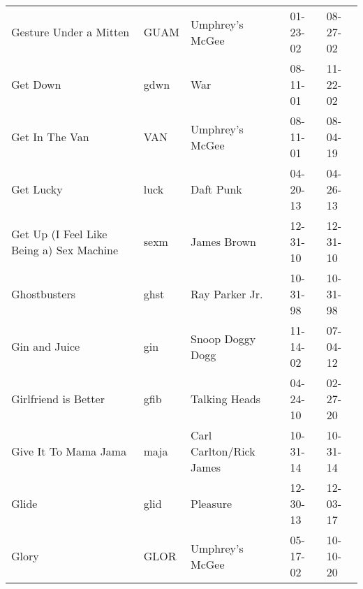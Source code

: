 \begin{longtable}{p{}p{}p{}p{}p{}}
                                                  Gesture Under a Mitten &          GUAM &                                          Umphrey's McGee &              01-23-02 &             08-27-02 \\
                                                                Get Down &          gdwn &                                                      War &              08-11-01 &             11-22-02 \\
                                                          Get In The Van &           VAN &                                          Umphrey's McGee &              08-11-01 &             08-04-19 \\
                                                               Get Lucky &          luck &                                                Daft Punk &              04-20-13 &             04-26-13 \\
                                Get Up (I Feel Like Being a) Sex Machine &          sexm &                                              James Brown &              12-31-10 &             12-31-10 \\
                                                            Ghostbusters &          ghst &                                           Ray Parker Jr. &              10-31-98 &             10-31-98 \\
                                                           Gin and Juice &           gin &                                         Snoop Doggy Dogg &              11-14-02 &             07-04-12 \\
                                                    Girlfriend is Better &          gfib &                                            Talking Heads &              04-24-10 &             02-27-20 \\
                                                    Give It To Mama Jama &          maja &                                  Carl Carlton/Rick James &              10-31-14 &             10-31-14 \\
                                                                   Glide &          glid &                                                 Pleasure &              12-30-13 &             12-03-17 \\
                                                                   Glory &          GLOR &                                          Umphrey's McGee &              05-17-02 &             10-10-20 \\

\end{longtable}

